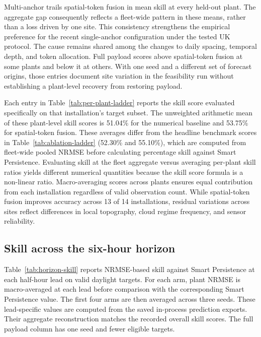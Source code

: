 Multi-anchor trails spatial-token fusion in mean skill at every held-out plant. The aggregate gap consequently reflects a fleet-wide pattern in these means, rather than a loss driven by one site. This consistency strengthens the empirical preference for the recent single-anchor configuration under the tested UK protocol. The cause remains shared among the changes to daily spacing, temporal depth, and token allocation. Full payload scores above spatial-token fusion at some plants and below it at others. With one seed and a different set of forecast origins, those entries document site variation in the feasibility run without establishing a plant-level recovery from restoring payload.

Each entry in Table~\ref{tab:per-plant-ladder} reports the skill score evaluated specifically on that installation's target subset. The unweighted arithmetic mean of these plant-level skill scores is 51.04\% for the numerical baseline and 53.75\% for spatial-token fusion. These averages differ from the headline benchmark scores in Table~\ref{tab:ablation-ladder} (52.30\% and 55.10\%), which are computed from fleet-wide pooled NRMSE before calculating percentage skill against Smart Persistence. Evaluating skill at the fleet aggregate versus averaging per-plant skill ratios yields different numerical quantities because the skill score formula is a non-linear ratio. Macro-averaging scores across plants ensures equal contribution from each installation regardless of valid observation count. While spatial-token fusion improves accuracy across 13 of 14 installations, residual variations across sites reflect differences in local topography, cloud regime frequency, and sensor reliability.

\subsection{Skill across the six-hour horizon}

Table~\ref{tab:horizon-skill} reports NRMSE-based skill against Smart Persistence at each half-hour lead on valid daylight targets. For each arm, plant NRMSE is macro-averaged at each lead before comparison with the corresponding Smart Persistence value. The first four arms are then averaged across three seeds. These lead-specific values are computed from the saved in-process prediction exports. Their aggregate reconstruction matches the recorded overall skill scores. The full payload column has one seed and fewer eligible targets.

